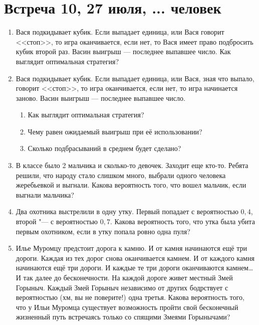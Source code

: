 \documentclass[pdftex,12pt,a4paper]{article}
\begin{document}
\newpage
\section{Встреча 10, 27 июля, ... человек}

\begin{enumerate}
\item Вася подкидывает кубик. Если выпадает единица, или Вася говорит
<<стоп>>, то игра оканчивается, если нет, то Вася имеет право подбросить кубик второй раз. Васин выигрыш --- последнее выпавшее число. Как выглядит оптимальная
стратегия?

\item Вася подкидывает кубик. Если выпадает единица, или Вася, зная что выпало, говорит
<<стоп>>, то игра оканчивается, если нет, то игра начинается заново. Васин выигрыш --- последнее выпавшее число.
\begin{enumerate}
\item Как выглядит оптимальная стратегия?
\item Чему равен ожидаемый выигрыш при её использовании?
\item Сколько подбрасываний в среднем будет сделано?  
\end{enumerate}
   

\item В классе было 2 мальчика и сколько-то девочек. Заходит еще кто-то. Ребята решили, что народу стало слишком много, выбрали одного человека жеребьевкой и выгнали. Какова вероятность того, что вошел мальчик, если выгнали мальчика?

\item Два охотника выстрелили в одну утку. Первый попадает с
вероятностью $0{,}4$, второй "--- с вероятностью $0{,}7$. Какова вероятность того, что утка была убита первым
охотником, если в утку попала ровно
одна пуля?

\item Илье Муромцу предстоит дорога к камню. И от камня начинаются ещё три дороги. Каждая из тех дорог снова оканчивается камнем. И от каждого камня начинаются ещё три дороги. И каждые те три дороги оканчиваются камнем\ldots И так далее до бесконечности. На каждой дороге живет местный Змей Горыныч. Каждый Змей Горыныч независимо от других бодрствует с вероятностью (хм, вы не поверите!) одна третья. Какова вероятность того, что у Ильи Муромца существует возможность пройти свой бесконечный жизненный путь встречаясь только со спящими Змеями Горынычами?

\end{enumerate}
\end{document}
